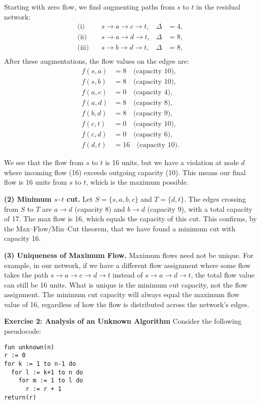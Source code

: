 \documentclass{article}
\theoremstyle{theorem}
\theoremstyle{definition}
\theoremstyle{remark}
\begin{document}
Starting with zero flow, we find augmenting paths from $s$ to $t$ in the residual network:
\begin{align*}
\text{(i)}&\quad s\to a\to c\to t, &\Delta &= 4,\\
\text{(ii)}&\quad s\to a\to d\to t, &\Delta &= 8,\\
\text{(iii)}&\quad s\to b\to d\to t, &\Delta &= 8,\\
\end{align*}
After these augmentations, the flow values on the edges are:
\begin{align*}
f(s,a) &= 8 \quad \text{(capacity 10)}, \\
f(s,b) &= 8 \quad \text{(capacity 10)}, \\
f(a,c) &= 0 \quad \text{(capacity 4)}, \\
f(a,d) &= 8 \quad \text{(capacity 8)}, \\
f(b,d) &= 8 \quad \text{(capacity 9)}, \\
f(c,t) &= 0 \quad \text{(capacity 10)}, \\
f(c,d) &= 0 \quad \text{(capacity 6)}, \\
f(d,t) &= 16 \quad \text{(capacity 10)}.
\end{align*}

We see that the flow from $s$ to $t$ is 16 units, but we have a violation at node $d$ where incoming flow (16) exceeds outgoing capacity (10). This means our final flow is 16 units from $s$ to $t$, which is the maximum possible.

\medskip
\noindent\textbf{(2) Minimum $s$--$t$ cut.}
Let $S = \{s, a, b, c\}$ and $T = \{d, t\}$. 
The edges crossing from $S$ to $T$ are $a\to d$ (capacity 8) and $b\to d$ (capacity 9), with a total capacity of 17.
The max flow is 16, which equals the capacity of this cut. This confirms, by the Max--Flow/Min--Cut theorem, that we have found a minimum cut with capacity 16.

\medskip
\noindent\textbf{(3) Uniqueness of Maximum Flow.}
Maximum flows need not be unique. For example, in our network, if we have a different flow assignment where some flow takes the path $s\to a\to c\to d\to t$ instead of $s\to a\to d\to t$, the total flow value can still be 16 units. What is unique is the minimum cut capacity, not the flow assignment. The minimum cut capacity will always equal the maximum flow value of 16, regardless of how the flow is distributed across the network's edges.

\vspace{1em}
\noindent\textbf{Exercise 2: Analysis of an Unknown Algorithm}
Consider the following pseudocode:
\begin{verbatim}
fun unknown(n)
r := 0
for k := 1 to n-1 do
  for l := k+1 to n do
    for m := 1 to l do
      r := r + 1
return(r)
\end{verbatim}
\end{document}
